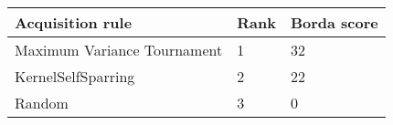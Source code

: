 \begin{tabular}{lll}
Acquisition rule & Rank & Borda score \\ 
\hline 
Maximum Variance Tournament        & 1 & 32 \\ 
KernelSelfSparring \citep{Sui2017} & 2 & 22 \\ 
Random                             & 3 & 0 \\ 
\hline 
\end{tabular}